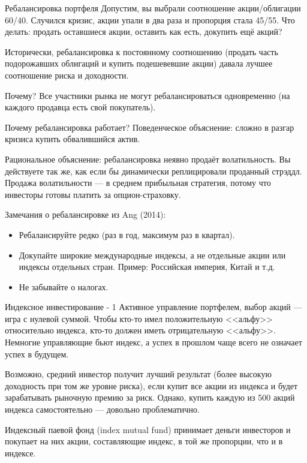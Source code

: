 \documentclass{beamer}
\begin{document}
\begin{frame}{Ребалансировка портфеля}
\justify
Допустим, вы выбрали соотношение акции/облигации 60/40. Случился кризис, акции 
упали в два раза и пропорция стала 45/55. Что делать: продать оставшиеся акции, 
оставить как есть, докупить ещё акций?

\justify
Исторически, ребалансировка к постоянному соотношению (продать часть 
подорожавших облигаций и купить подешевевшие акции) давала лучшее соотношение 
риска и доходности.

\justify
Почему? Все участники рынка не могут ребалансироваться 
одновременно (на каждого продавца есть свой покупатель).
\end{frame}



\begin{frame}{Почему ребалансировка работает?}
\justify
Поведенческое объяснение: сложно в разгар кризиса купить обвалившийся актив. 

Рациональное объяснение: ребалансировка неявно продаёт волатильность. Вы 
действуете так же, как если бы динамически реплицировали проданный стрэддл. 
Продажа волатильности --- в среднем прибыльная стратегия, потому что инвесторы 
готовы платить за опцион-страховку.

\justify
Замечания о ребалансировке из Ang (2014):
\begin{itemize}
\justifying
\item Ребалансируйте редко (раз в год, максимум раз в квартал).
\item Докупайте широкие международные индексы, а не отдельные акции или индексы 
отдельных стран. Пример: Российская империя, Китай и т.д.
\item Не забывайте о налогах.
\end{itemize}
\end{frame}



\begin{frame}{Индексное инвестирование - 1}
\justify
Активное управление портфелем, выбор акций --- игра с нулевой суммой. Чтобы 
кто-то имел положительную <<альфу>> относительно индекса, кто-то должен иметь 
отрицательную <<альфу>>. Немногие управляющие бьют индекс, а успех в прошлом 
чаще всего не означает успех в будущем.

\justify
Возможно, средний инвестор получит лучший результат (более высокую доходность 
при том же уровне риска), если купит все акции из индекса и будет зарабатывать 
рыночную премию за риск. Однако, купить каждую из 500 акций индекса 
самостоятельно --- довольно проблематично.

\justify
Индексный паевой фонд (index mutual fund) принимает деньги инвесторов и 
покупает на них акции, составляющие индекс, в той же пропорции, что и в 
индексе.
\end{frame}
\end{document}
